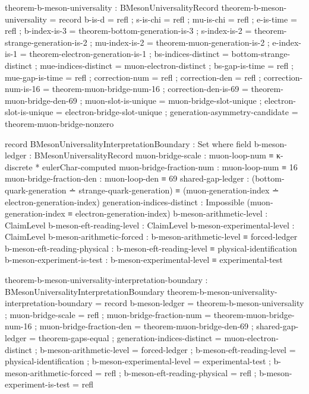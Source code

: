 \documentclass[11pt,a4paper]{book}
\begin{document}
\begin{code}
theorem-b-meson-universality : BMesonUniversalityRecord
theorem-b-meson-universality = record
  { b-is-d             = refl
  ; s-is-chi           = refl
  ; mu-is-chi          = refl
  ; e-is-time          = refl
  ; b-index-is-3       = theorem-bottom-generation-is-3
  ; s-index-is-2       = theorem-strange-generation-is-2
  ; mu-index-is-2      = theorem-muon-generation-is-2
  ; e-index-is-1       = theorem-electron-generation-is-1
  ; bs-indices-distinct = bottom-strange-distinct
  ; mue-indices-distinct = muon-electron-distinct
  ; bs-gap-is-time     = refl
  ; mue-gap-is-time    = refl
  ; correction-num     = refl
  ; correction-den     = refl
  ; correction-num-is-16 = theorem-muon-bridge-num-16
  ; correction-den-is-69 = theorem-muon-bridge-den-69
  ; muon-slot-is-unique = muon-bridge-slot-unique
  ; electron-slot-is-unique = electron-bridge-slot-unique
  ; generation-asymmetry-candidate = theorem-muon-bridge-nonzero }

record BMesonUniversalityInterpretationBoundary : Set where
  field
    b-meson-ledger          : BMesonUniversalityRecord
    muon-bridge-scale       : muon-loop-num ≡ κ-discrete * eulerChar-computed
    muon-bridge-fraction-num : muon-loop-num ≡ 16
    muon-bridge-fraction-den : muon-loop-den ≡ 69
    shared-gap-ledger       : (bottom-quark-generation ∸ strange-quark-generation) ≡
                              (muon-generation-index   ∸ electron-generation-index)
    generation-indices-distinct : Impossible (muon-generation-index ≡ electron-generation-index)
    b-meson-arithmetic-level : ClaimLevel
    b-meson-eft-reading-level : ClaimLevel
    b-meson-experimental-level : ClaimLevel
    b-meson-arithmetic-forced : b-meson-arithmetic-level ≡ forced-ledger
    b-meson-eft-reading-physical : b-meson-eft-reading-level ≡ physical-identification
    b-meson-experiment-is-test : b-meson-experimental-level ≡ experimental-test

theorem-b-meson-universality-interpretation-boundary : BMesonUniversalityInterpretationBoundary
theorem-b-meson-universality-interpretation-boundary = record
  { b-meson-ledger             = theorem-b-meson-universality
  ; muon-bridge-scale          = refl
  ; muon-bridge-fraction-num   = theorem-muon-bridge-num-16
  ; muon-bridge-fraction-den   = theorem-muon-bridge-den-69
  ; shared-gap-ledger          = theorem-gaps-equal
  ; generation-indices-distinct = muon-electron-distinct
  ; b-meson-arithmetic-level   = forced-ledger
  ; b-meson-eft-reading-level  = physical-identification
  ; b-meson-experimental-level = experimental-test
  ; b-meson-arithmetic-forced  = refl
  ; b-meson-eft-reading-physical = refl
  ; b-meson-experiment-is-test = refl }
\end{code}
\end{document}
